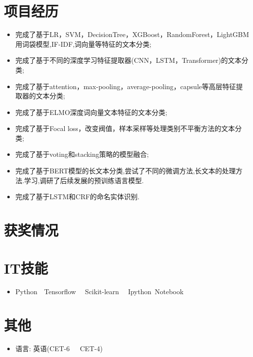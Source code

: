 \documentclass{resume}
\begin{document}
\section{项目经历}
\begin{itemize}
  \item 完成了基于LR，SVM，DecisionTree，XGBoost，RandomForest，LightGBM用词袋模型,IF-IDF,词向量等特征的文本分类;
  \item 完成了基于不同的深度学习特征提取器(CNN，LSTM，Transformer)的文本分类;
  \item 完成了基于attention，max-pooling，average-pooling，capsule等高层特征提取器的文本分类;
  \item 完成了基于ELMO深度词向量文本特征的文本分类;
  \item 完成了基于Focal loss，改变阀值，样本采样等处理类别不平衡方法的文本分类;
  \item 完成了基于voting和stacking策略的模型融合;
  \item 完成了基于BERT模型的长文本分类,尝试了不同的微调方法,长文本的处理方法.学习,调研了后续发展的预训练语言模型.
  \item 完成了基于LSTM和CRF的命名实体识别.
\end{itemize}


\section{获奖情况}

\section{IT技能}
\begin{itemize}[parsep=0.5ex]
  \item Python\ \ Tensorflow \ \ Scikit-learn \ \ Ipython\ Notebook 
\end{itemize}


\section{其他}
\begin{itemize}[parsep=0.5ex]
  \item 语言: 英语(CET-6\ \ \ CET-4)
\end{itemize}
\end{document}

